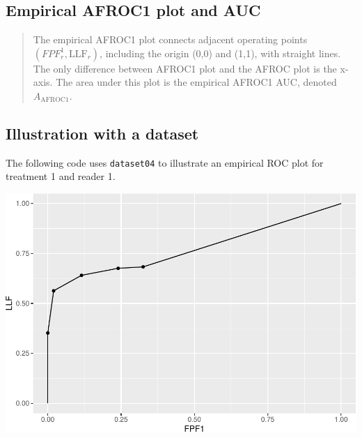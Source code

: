 \documentclass[
]{book}
\newenvironment{Shaded}{\begin{snugshade}}{\end{snugshade}}
\newcommand{\DataTypeTok}[1]{\textcolor[rgb]{0.13,0.29,0.53}{#1}}
\newcommand{\DecValTok}[1]{\textcolor[rgb]{0.00,0.00,0.81}{#1}}
\newcommand{\KeywordTok}[1]{\textcolor[rgb]{0.13,0.29,0.53}{\textbf{#1}}}
\newcommand{\NormalTok}[1]{#1}
\newcommand{\OperatorTok}[1]{\textcolor[rgb]{0.81,0.36,0.00}{\textbf{#1}}}
\newcommand{\StringTok}[1]{\textcolor[rgb]{0.31,0.60,0.02}{#1}}
\begin{document}
\hypertarget{empirical-definition-empirical-auc-afroc1}{%
\subsection{Empirical AFROC1 plot and AUC}\label{empirical-definition-empirical-auc-afroc1}}

\begin{quote}
The empirical AFROC1 plot connects adjacent operating points \(\left ( FPF_r^1, \text{LLF}_r \right )\), including the origin (0,0) and (1,1), with straight lines. The only difference between AFROC1 plot and the AFROC plot is the x-axis. The area under this plot is the empirical AFROC1 AUC, denoted \(A_{\text{AFROC1}}\).
\end{quote}

\hypertarget{empirical-afroc1-plot-illustration}{%
\subsection{Illustration with a dataset}\label{empirical-afroc1-plot-illustration}}

The following code uses \texttt{dataset04} to illustrate an empirical ROC plot for treatment 1 and reader 1.

\begin{Shaded}
\end{Shaded}

\includegraphics{03-empirical_files/figure-latex/unnamed-chunk-31-1.pdf}
\end{document}
